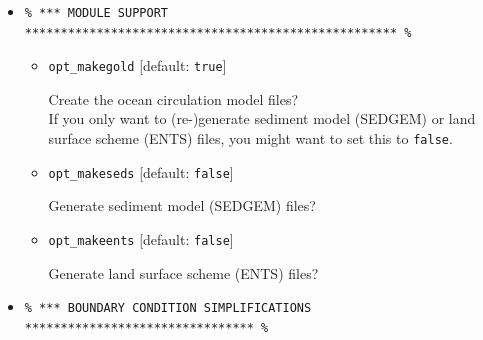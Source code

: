 \begin{itemize}
\begin{itemize}[noitemsep]
\vspace{1mm}
\item \texttt{par\_max\_D} [default: \texttt{5000.0}]

Sets the maximum ocean (scale) depth (in m).
\\This is almost invariably 5000.0, but some series of paleo configurations use 5500.0 m.

\end{itemize}

\newpage

\vspace{2mm}
\item []
\small\vspace{-2pt}\begin{verbatim}
% *** MODULE SUPPORT **************************************************** %
\end{verbatim}\vspace{-2pt}\normalsize

\begin{itemize}[noitemsep]

\vspace{1mm}
\item \texttt{opt\_makegold} [default: \texttt{true}]

Create the ocean circulation model files?
\\If you only want to (re-)generate sediment model (SEDGEM) or land surface scheme (ENTS) files, you might want to set this to \texttt{false}.

\vspace{1mm}
\item \texttt{opt\_makeseds} [default: \texttt{false}]

Generate sediment model (SEDGEM) files?

\vspace{1mm}
\item \texttt{opt\_makeents} [default: \texttt{false}]

Generate land surface scheme (ENTS) files?

\end{itemize}

\vspace{2mm}
\item []
\small\vspace{-2pt}\begin{verbatim}
% *** BOUNDARY CONDITION SIMPLIFICATIONS ******************************** %
\end{verbatim}\vspace{-2pt}\normalsize


\end{itemize}

